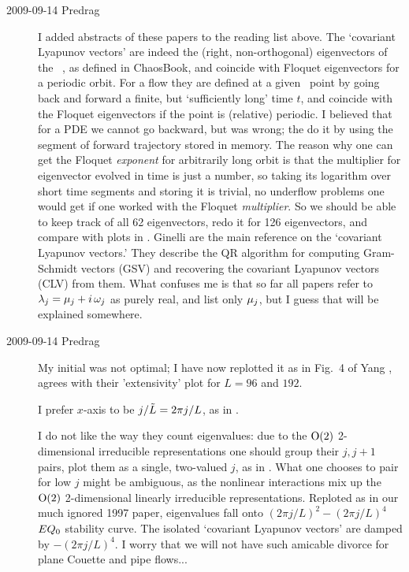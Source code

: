 \begin{description}
\item[2009-09-14 Predrag]
I added abstracts of these papers to the reading list above.
The `covariant Lyapunov vectors' are indeed the (right,
non-orthogonal) eigenvectors of the \jacobianM\ \jMps, as
defined in ChaosBook, and coincide with Floquet eigenvectors
for a periodic orbit. For a flow they are defined at a given
\statesp\ point by going back and forward a finite, but
`sufficiently long' time $t$, and coincide with the Floquet
eigenvectors if the point is (relative) periodic. I believed
that for a PDE we cannot go backward, but was wrong; the do
it by using the segment of forward trajectory stored in
memory. The reason why one can get the Floquet {\em exponent}
for arbitrarily long orbit is that the multiplier for eigenvector
evolved in time is just a number, so taking its logarithm over
short time segments and
storing it is trivial, no underflow problems one would get if
one worked with the Floquet {\em multiplier}. So we should be able
to keep track of all 62 eigenvectors, redo it for 126 eigenvectors,
and compare with plots in .
Ginelli \etal{} are the main
reference on the `covariant Lyapunov vectors.' They describe
the QR algorithm for computing Gram-Schmidt vectors (GSV) and
recovering the covariant Lyapunov vectors (CLV) from them.
What confuses me is that so far all papers refer to $\Lyap_j
= \eigRe_j + i \, \eigIm_j$ as purely real, and list only
$\eigRe_j$, but I guess that will be explained somewhere.

\item[2009-09-14 Predrag]
My initial  was not optimal; I have now
replotted it as in Fig.~4 of
Yang \etal{},
agrees with their 'extensivity' plot for $L=96$ and $192$.

I prefer $x$-axis to be $j/\tilde{L} = 2 \pi j/L$, as in
.

I do not like the way they count eigenvalues:  due to the $\textrm{O}(2)$
2-dimensional irreducible representations
one should group their $j,j+1$ pairs,
plot them as a single, two-valued $j$, as in
. What one chooses to pair for low
$j$ might be ambiguous, as the nonlinear interactions mix up
the $\textrm{O}(2)$ 2-dimensional linearly irreducible representations.
Reploted as in our much ignored 1997 paper,
eigenvalues fall onto $ (2 \pi j/L)^2 - (2 \pi j/L)^4 $
\eqv\ $EQ_{0}$  stability curve.
The isolated `covariant Lyapunov vectors'
are damped by $-(2 \pi j/L)^4$. I worry that we will not have such
amicable divorce for plane Couette and pipe flows...


\end{description}
